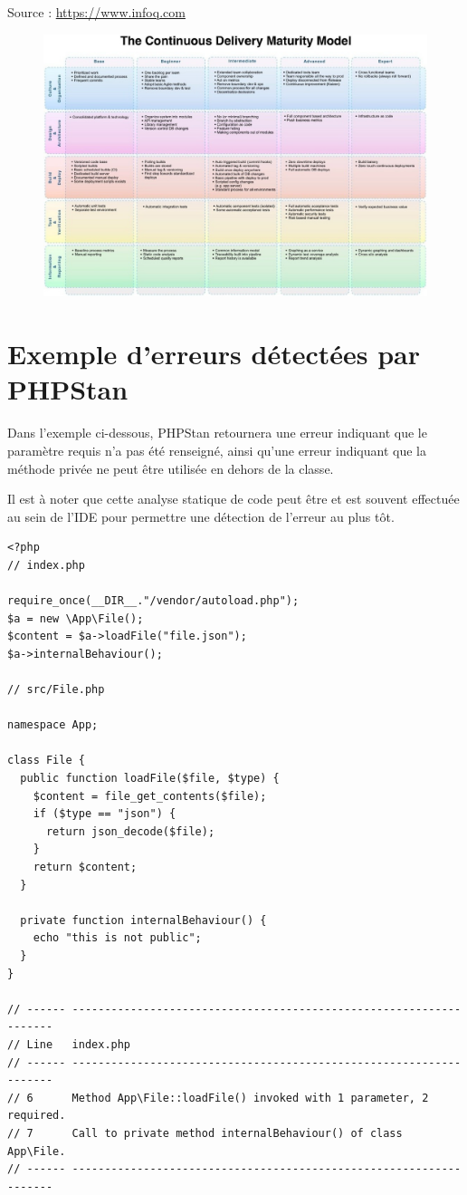 \normalsize{Source : \url{https://www.infoq.com}}

\begin{figure}[ht]
	\centering
	\includegraphics[scale=0.62,angle=-90]{img/devops-matrice.jpg}
	\label{annexe:devops-matrice}
\end{figure}

\clearpage
\section{Exemple d'erreurs détectées par PHPStan}

Dans l'exemple ci-dessous, PHPStan retournera une erreur indiquant que le paramètre requis  n'a pas été renseigné, ainsi qu'une erreur indiquant que la méthode privée  ne peut être utilisée en dehors de la classe. 

Il est à noter que cette analyse statique de code peut être et est souvent effectuée au sein de l'\gls{IDE} pour permettre une détection de l'erreur au plus tôt.

\begin{verbatim}
<?php
// index.php

require_once(__DIR__."/vendor/autoload.php");
$a = new \App\File();
$content = $a->loadFile("file.json");
$a->internalBehaviour();

// src/File.php

namespace App;

class File {
  public function loadFile($file, $type) {
    $content = file_get_contents($file);
    if ($type == "json") {
      return json_decode($file);
    }
    return $content;
  }
  
  private function internalBehaviour() {
    echo "this is not public";
  }
}

// ------ ------------------------------------------------------------------- 
// Line   index.php                                                          
// ------ ------------------------------------------------------------------- 
// 6      Method App\File::loadFile() invoked with 1 parameter, 2 required.  
// 7      Call to private method internalBehaviour() of class App\File.      
// ------ ------------------------------------------------------------------- 

\end{verbatim}
\label{annexe:php-error}
